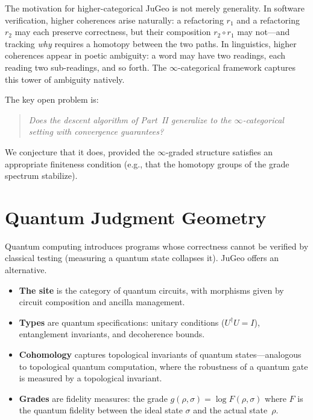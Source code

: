 \begin{remark}
The motivation for higher-categorical JuGeo is not merely
generality.  In software verification, higher coherences arise
naturally: a refactoring $r_1$ and a refactoring $r_2$ may each
preserve correctness, but their composition $r_2 \circ r_1$ may
not---and tracking \emph{why} requires a homotopy between the
two paths.  In linguistics, higher coherences appear in poetic
ambiguity: a word may have two readings, each reading two
sub-readings, and so forth.  The $\infty$-categorical framework
captures this tower of ambiguity natively.
\end{remark}

The key open problem is:

\begin{quote}
\emph{Does the descent algorithm of Part~II generalize to the
$\infty$-categorical setting with convergence guarantees?}
\end{quote}

We conjecture that it does, provided the $\infty$-graded structure
satisfies an appropriate finiteness condition (e.g., that the
homotopy groups of the grade spectrum stabilize).

\section{Quantum Judgment Geometry}
\label{sec:quantum}

Quantum computing introduces programs whose correctness cannot be
verified by classical testing (measuring a quantum state collapses
it).  JuGeo offers an alternative.

\begin{itemize}
  \item \textbf{The site} is the category of quantum circuits,
        with morphisms given by circuit composition and ancilla
        management.
  \item \textbf{Types} are quantum specifications: unitary
        conditions ($U^\dagger U = I$), entanglement invariants,
        and decoherence bounds.
  \item \textbf{Cohomology} captures topological invariants of
        quantum states---analogous to topological quantum
        computation, where the robustness of a quantum gate is
        measured by a topological invariant.
  \item \textbf{Grades} are fidelity measures: the grade
        $g(\rho, \sigma) = \log F(\rho, \sigma)$ where $F$ is the
        quantum fidelity between the ideal state $\sigma$ and the
        actual state~$\rho$.
\end{itemize}


